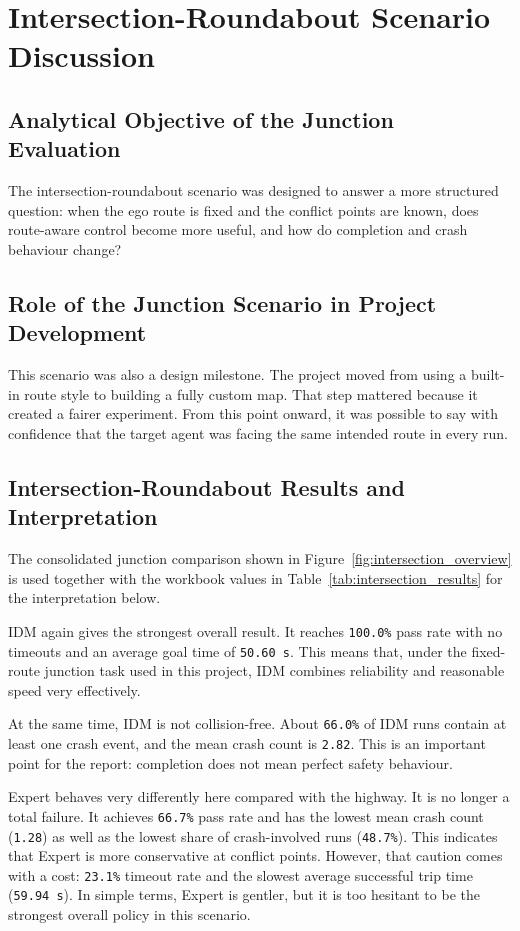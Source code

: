 \documentclass[12pt,a4paper]{report}
\begin{document}
\section{Intersection-Roundabout Scenario Discussion}

\subsection{Analytical Objective of the Junction Evaluation}
The intersection-roundabout scenario was designed to answer a more structured question: when the ego route is fixed and the conflict points are known, does route-aware control become more useful, and how do completion and crash behaviour change?

\subsection{Role of the Junction Scenario in Project Development}
This scenario was also a design milestone. The project moved from using a built-in route style to building a fully custom map. That step mattered because it created a fairer experiment. From this point onward, it was possible to say with confidence that the target agent was facing the same intended route in every run.

\subsection{Intersection-Roundabout Results and Interpretation}
The consolidated junction comparison shown in Figure~\ref{fig:intersection_overview} is used together with the workbook values in Table~\ref{tab:intersection_results} for the interpretation below.

IDM again gives the strongest overall result. It reaches \texttt{100.0\%} pass rate with no timeouts and an average goal time of \texttt{50.60 s}. This means that, under the fixed-route junction task used in this project, IDM combines reliability and reasonable speed very effectively.

At the same time, IDM is not collision-free. About \texttt{66.0\%} of IDM runs contain at least one crash event, and the mean crash count is \texttt{2.82}. This is an important point for the report: completion does not mean perfect safety behaviour.

Expert behaves very differently here compared with the highway. It is no longer a total failure. It achieves \texttt{66.7\%} pass rate and has the lowest mean crash count (\texttt{1.28}) as well as the lowest share of crash-involved runs (\texttt{48.7\%}). This indicates that Expert is more conservative at conflict points. However, that caution comes with a cost: \texttt{23.1\%} timeout rate and the slowest average successful trip time (\texttt{59.94 s}). In simple terms, Expert is gentler, but it is too hesitant to be the strongest overall policy in this scenario.
\end{document}
